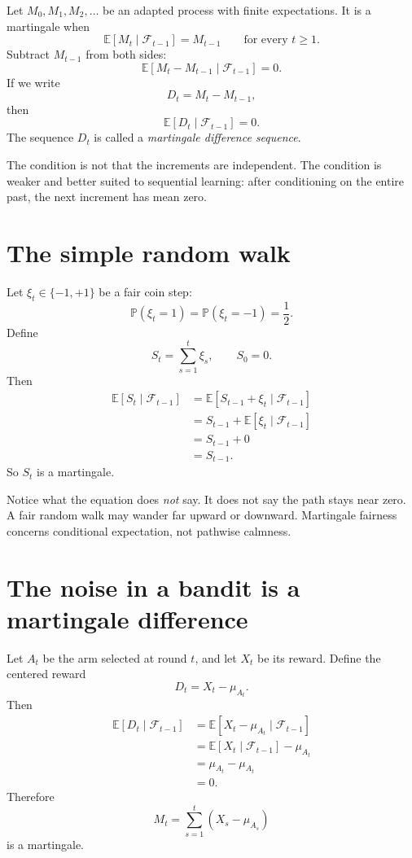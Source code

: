 \documentclass[en,nofont,11pt]{elegantbook}
\newcommand{\E}{\mathbb{E}}
\newcommand{\Pbb}{\mathbb{P}}
\newcommand{\F}{\mathcal{F}}
\begin{document}
Let $M_0,M_1,M_2,\ldots$ be an adapted process with finite expectations. It is a martingale when
\[
\E[M_t\mid \F_{t-1}]=M_{t-1}
\qquad\text{for every }t\ge 1.
\]
Subtract $M_{t-1}$ from both sides:
\[
\E[M_t-M_{t-1}\mid \F_{t-1}]=0.
\]
If we write
\[
D_t=M_t-M_{t-1},
\]
then
\[
\boxed{\E[D_t\mid \F_{t-1}]=0.}
\]
The sequence $D_t$ is called a \emph{martingale difference sequence}.

\begin{keyidea}
The condition is not that the increments are independent. The condition is weaker and better suited to sequential learning: after conditioning on the entire past, the next increment has mean zero.
\end{keyidea}

\section{The simple random walk}

Let $\xi_t\in\{-1,+1\}$ be a fair coin step:
\[
\Pbb(\xi_t=1)=\Pbb(\xi_t=-1)=\frac12.
\]
Define
\[
S_t=\sum_{s=1}^{t}\xi_s,
\qquad S_0=0.
\]
Then
\begin{align*}
\E[S_t\mid\F_{t-1}]
&=\E[S_{t-1}+\xi_t\mid\F_{t-1}]\\
&=S_{t-1}+\E[\xi_t\mid\F_{t-1}]\\
&=S_{t-1}+0\\
&=S_{t-1}.
\end{align*}
So $S_t$ is a martingale.

Notice what the equation does \emph{not} say. It does not say the path stays near zero. A fair random walk may wander far upward or downward. Martingale fairness concerns conditional expectation, not pathwise calmness.

\section{The noise in a bandit is a martingale difference}

Let $A_t$ be the arm selected at round $t$, and let $X_t$ be its reward. Define the centered reward
\[
D_t=X_t-\mu_{A_t}.
\]
Then
\begin{align*}
\E[D_t\mid\F_{t-1}]
&=\E[X_t-\mu_{A_t}\mid\F_{t-1}]\\
&=\E[X_t\mid\F_{t-1}]-\mu_{A_t}\\
&=\mu_{A_t}-\mu_{A_t}\\
&=0.
\end{align*}
Therefore
\[
M_t=\sum_{s=1}^{t}(X_s-\mu_{A_s})
\]
is a martingale.
\end{document}
